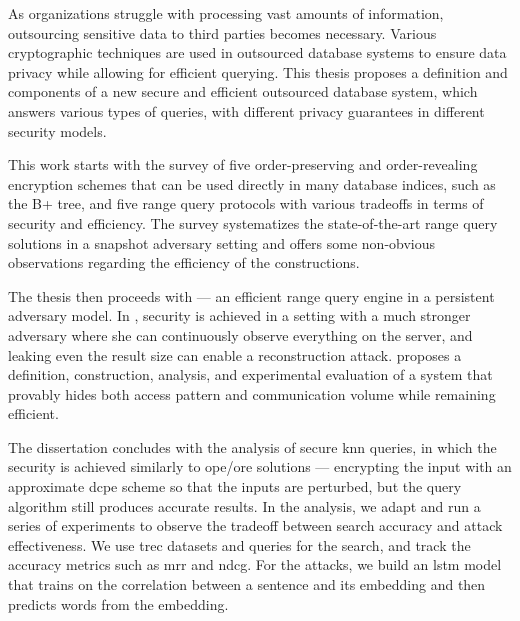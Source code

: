 As organizations struggle with processing vast amounts of information, outsourcing sensitive data to third parties becomes necessary.
Various cryptographic techniques are used in outsourced database systems to ensure data privacy while allowing for efficient querying.
This thesis proposes a definition and components of a new secure and efficient outsourced database system, which answers various types of queries, with different privacy guarantees in different security models.

This work starts with the survey of five order-preserving and order-revealing encryption schemes that can be used directly in many database indices, such as the B+ tree, and five range query protocols with various tradeoffs in terms of security and efficiency.
The survey systematizes the state-of-the-art range query solutions in a snapshot adversary setting and offers some non-obvious observations regarding the efficiency of the constructions.

The thesis then proceeds with \epsolute{} --- an efficient range query engine in a persistent adversary model.
In \epsolute{}, security is achieved in a setting with a much stronger adversary where she can continuously observe everything on the server, and leaking even the result size can enable a reconstruction attack.
\epsolute{} proposes a definition, construction, analysis, and experimental evaluation of a system that provably hides both access pattern and communication volume while remaining efficient.

The dissertation concludes with the analysis of secure \acrlong{knn} queries, in which the security is achieved similarly to \acrshort{ope}/\acrshort{ore} solutions --- encrypting the input with an approximate \acrlong{dcpe} scheme so that the inputs are perturbed, but the query algorithm still produces accurate results.
In the analysis, we adapt and run a series of experiments to observe the tradeoff between search accuracy and attack effectiveness.
We use \acrshort{trec} datasets and queries for the search, and track the accuracy metrics such as \acrshort{mrr} and \acrshort{ndcg}.
For the attacks, we build an \acrshort{lstm} model that trains on the correlation between a sentence and its embedding and then predicts words from the embedding.
